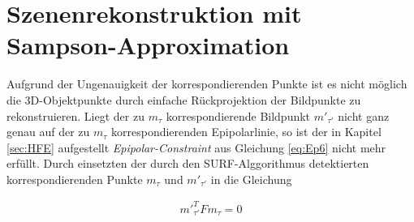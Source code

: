
\section{Szenenrekonstruktion mit Sampson-Approximation}
\label{sec:sampson}

Aufgrund der Ungenauigkeit der korrespondierenden Punkte ist es nicht möglich die 3D-Objektpunkte durch einfache Rückprojektion der Bildpunkte zu rekonstruieren. Liegt der zu $m_\tau$ korrespondierende Bildpunkt $m'_{\tau'}$ nicht ganz genau auf der zu $m_\tau$ korrespondierenden Epipolarlinie, so ist der in Kapitel \ref{sec:HFE} aufgestellt \textit{Epipolar-Constraint} aus Gleichung \ref{eq:Ep6} nicht mehr erfüllt. Durch einsetzten der durch den SURF-Alggorithmus detektierten korrespondierenden Punkte $m_\tau$ und $m'_{\tau'}$ in die Gleichung 

\begin{gather}
	m'^T_{\tau'}Fm_\tau = 0
\end{gather}

